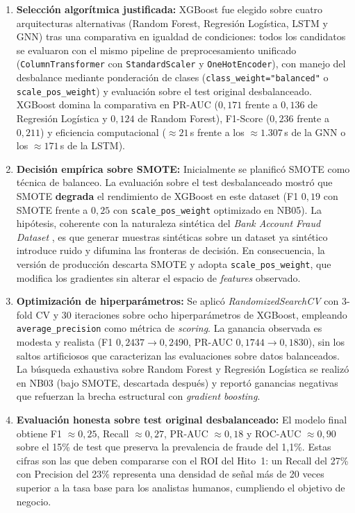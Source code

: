\documentclass[12pt,a4paper]{report}
\begin{document}
\begin{enumerate}
    \item \textbf{Selección algorítmica justificada:} XGBoost fue elegido sobre cuatro arquitecturas alternativas (Random Forest, Regresión Logística, LSTM y GNN) tras una comparativa en igualdad de condiciones: todos los candidatos se evaluaron con el mismo pipeline de preprocesamiento unificado (\texttt{ColumnTransformer} con \texttt{StandardScaler} y \texttt{OneHotEncoder}), con manejo del desbalance mediante ponderación de clases (\texttt{class\_weight="balanced"} o \texttt{scale\_pos\_weight}) y evaluación sobre el test original desbalanceado. XGBoost domina la comparativa en PR-AUC ($0{,}171$ frente a $0{,}136$ de Regresión Logística y $0{,}124$ de Random Forest), F1-Score ($0{,}236$ frente a $0{,}211$) y eficiencia computacional ($\approx 21$\,s frente a los $\approx 1.307$\,s de la GNN o los $\approx 171$\,s de la LSTM).

    \item \textbf{Decisión empírica sobre SMOTE:} Inicialmente se planificó SMOTE como técnica de balanceo. La evaluación sobre el test desbalanceado mostró que SMOTE \textbf{degrada} el rendimiento de XGBoost en este dataset (F1 $0{,}19$ con SMOTE frente a $0{,}25$ con \texttt{scale\_pos\_weight} optimizado en NB05). La hipótesis, coherente con la naturaleza sintética del \textit{Bank Account Fraud Dataset} \cite{jesus2022bank}, es que generar muestras sintéticas sobre un dataset ya sintético introduce ruido y difumina las fronteras de decisión. En consecuencia, la versión de producción descarta SMOTE y adopta \texttt{scale\_pos\_weight}, que modifica los gradientes sin alterar el espacio de \textit{features} observado.

    \item \textbf{Optimización de hiperparámetros:} Se aplicó \textit{RandomizedSearchCV} con 3-fold CV y 30 iteraciones sobre ocho hiperparámetros de XGBoost, empleando \texttt{average\_precision} como métrica de \textit{scoring}. La ganancia observada es modesta y realista (F1 $0{,}2437 \rightarrow 0{,}2490$, PR-AUC $0{,}1744 \rightarrow 0{,}1830$), sin los saltos artificiosos que caracterizan las evaluaciones sobre datos balanceados. La búsqueda exhaustiva sobre Random Forest y Regresión Logística se realizó en NB03 (bajo SMOTE, descartada después) y reportó ganancias negativas que refuerzan la brecha estructural con \textit{gradient boosting}.

    \item \textbf{Evaluación honesta sobre test original desbalanceado:} El modelo final obtiene F1 $\approx 0{,}25$, Recall $\approx 0{,}27$, PR-AUC $\approx 0{,}18$ y ROC-AUC $\approx 0{,}90$ sobre el 15\% de test que preserva la prevalencia de fraude del 1,1\%. Estas cifras son las que deben compararse con el ROI del Hito~1: un Recall del 27\% con Precision del 23\% representa una densidad de señal más de 20 veces superior a la tasa base para los analistas humanos, cumpliendo el objetivo de negocio.


\end{enumerate}
\end{document}
